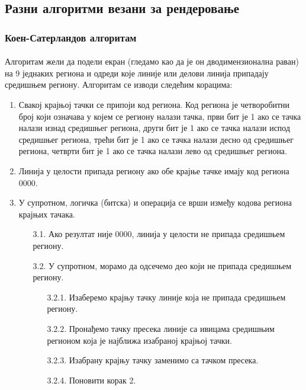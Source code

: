 \documentclass[12pt]{article}
\begin{document}
	\subsection{Разни алгоритми везани за рендеровање}
	
	\subsubsection{Коен-Сатерландов алгоритам}\label{koensaterland}
	\paragraph{}
	Алгоритам жели да подели екран (гледамо као да је он дводимензионална раван) на 9 једнаких региона и одреди које линије или делови линија припадају средишњем региону. Алгоритам се изводи следећим корацима:
	\begin{enumerate}
		\item Свакој крајњој тачки се припоји код региона. Код региона је четворобитни број који означава у којем се региону налази тачка, први бит је 1 ако се тачка налази изнад средишњег региона, други бит је 1 ако се тачка налази испод средишњег региона, трећи бит је 1 ако се тачка налази десно од средишњег региона, четврти бит је 1 ако се тачка налази лево од средишњег региона.
		\item Линија у целости припада региону ако обе крајње тачке имају код региона 0000.
		\item У супротном, логичка (битска) и операција се врши између кодова региона крајњих тачака.
		\begin{enumerate}
			\item[3.1.] Ако резултат није 0000, линија у целости не припада средишњем региону.
			\item[3.2.] У супротном, морамо да одсечемо део који не припада средишњем региону.
			\begin{enumerate}
				\item[3.2.1.] Изаберемо крајњу тачку линије која не припада средишњем региону.
				\item[3.2.2.] Пронађемо тачку пресека линије са ивицама средишњим регионом која је најближа изабраној крајњој тачки.
				\item[3.2.3.] Изабрану крајњу тачку заменимо са тачком пресека.
				\item[3.2.4.] Поновити корак 2.
			\end{enumerate}
		\end{enumerate}
	\end{enumerate}
	
\end{document}
